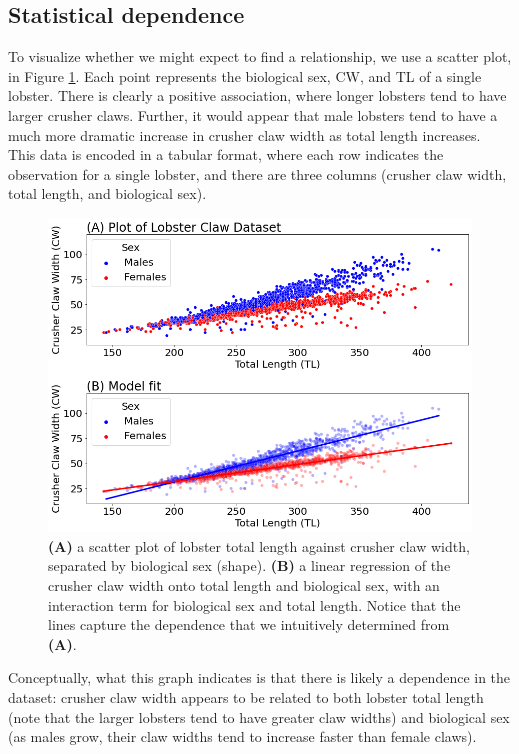 \subsection{Statistical dependence}

To visualize whether we might expect to find a relationship, we use a scatter plot, in Figure \ref{fig:ch5:lobster}. Each point represents the biological sex, CW, and TL of a single lobster. There is clearly a positive association, where longer lobsters tend to have larger crusher claws. Further, it would appear that male lobsters tend to have a much more dramatic increase in crusher claw width as total length increases. This data is encoded in a tabular format, where each row indicates the observation for a single lobster, and there are three columns (crusher claw width, total length, and biological sex). 

\begin{figure}[h]
    \centering
    \includegraphics[width=0.7\linewidth]{representations/ch6/Images/lobster.png}
    \caption[Lobster example]{\textbf{(A)} a scatter plot of lobster total length against crusher claw width, separated by biological sex (shape). \textbf{(B)} a linear regression of the crusher claw width onto total length and biological sex, with an interaction term for biological sex and total length. Notice that the lines capture the dependence that we intuitively determined from \textbf{(A)}.}
    \label{fig:ch5:lobster}
\end{figure}


Conceptually, what this graph indicates is that there is likely a dependence in the dataset: crusher claw width appears to be related to both lobster total length (note that the larger lobsters tend to have greater claw widths) and biological sex (as males grow, their claw widths tend to increase faster than female claws).

